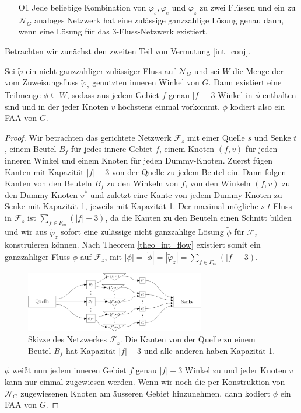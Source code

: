 \begin{itemize}
\item [O1] Jede beliebige Kombination von $\varphi_s,\varphi_e$ und $\varphi_z$ zu zwei Flüssen und ein zu $\mathcal{N}_G$ analoges Netzwerk hat eine zulässige ganzzahlige Lösung genau dann, wenn eine Lösung für das 3-Fluss-Netzwerk existiert.
\end{itemize}

Betrachten wir zunächst den zweiten Teil von Vermutung \ref{int_conj}.

\begin{lemma}\label{lem_faa}
Sei $\tilde{\varphi}$ ein nicht ganzzahliger zulässiger Fluss auf $\mathcal{N}_G$ und sei $W$ die Menge der vom Zuweisungsfluss $\tilde{\varphi}_z$ genutzten inneren Winkel von $G$. Dann existiert eine Teilmenge $\phi\subseteq W$, sodass aus jedem Gebiet $f$ genau $|f|-3$ Winkel in $\phi$ enthalten sind und in der jeder Knoten $v$ höchstens einmal vorkommt. $\phi$ kodiert also ein FAA von $G$.
\end{lemma}

\begin{proof}
Wir betrachten das gerichtete Netzwerk $\mathcal{F}_z$ mit einer Quelle $s$ und Senke $t$, einem Beutel $B_f$ für jedes innere Gebiet $f$, einem Knoten $(f,v)$ für jeden inneren Winkel und einem Knoten für jeden Dummy-Knoten. Zuerst fügen Kanten mit Kapazität $|f|-3$ von der Quelle zu jedem Beutel ein. Dann folgen Kanten von den Beuteln $B_f$ zu den Winkeln von $f$, von den Winkeln $(f,v)$ zu den Dummy-Knoten $v^*$ und zuletzt eine Kante von jedem Dummy-Knoten zu Senke mit Kapazität 1, jeweils mit Kapazität 1. Der maximal mögliche $s$-$t$-Fluss in $\mathcal{F}_z$ ist $\sum_{f \in F_{in}}(|f|-3)$, da die Kanten zu den Beuteln einen Schnitt bilden und wir  aus $\tilde{\varphi}_z$ sofort eine zulässige nicht ganzzahlige Lösung $\tilde{\phi}$ für $\mathcal{F}_z$ konstruieren können. Nach Theorem \ref{theo_int_flow} existiert somit ein ganzzahliger Fluss $\phi$ auf $\mathcal{F}_z$, mit $|\phi| = |\tilde{\phi}| = |\tilde{\varphi}_z| = \sum_{f \in F_{in}}(|f|-3).$

\begin{figure}[h]
	\centering
  	\includegraphics[width=0.7\textwidth]{lem_faa_choice.png}
  	\caption{Skizze des Netzwerkes $\mathcal{F}_z$. Die Kanten von der Quelle zu einem Beutel $B_f$ hat Kapazität $|f|-3$ und alle anderen haben Kapazität 1.}
\end{figure}

$\phi$ weißt nun jedem inneren Gebiet $f$ genau $|f|-3$ Winkel zu und jeder Knoten $v$ kann nur einmal zugewiesen werden. Wenn wir noch die per Konstruktion von $\mathcal{N}_G$ zugewiesenen Knoten am äusseren Gebiet hinzunehmen, dann kodiert $\phi$ ein FAA von $G$.
\end{proof}

